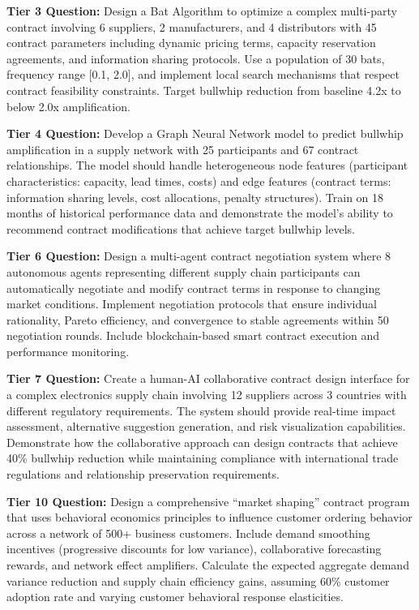 \documentclass{article}
\begin{document}
\textbf{Tier 3 Question:} Design a Bat Algorithm to optimize a complex multi-party contract involving 6 suppliers, 2 manufacturers, and 4 distributors with 45 contract parameters including dynamic pricing terms, capacity reservation agreements, and information sharing protocols. Use a population of 30 bats, frequency range [0.1, 2.0], and implement local search mechanisms that respect contract feasibility constraints. Target bullwhip reduction from baseline 4.2x to below 2.0x amplification.

\textbf{Tier 4 Question:} Develop a Graph Neural Network model to predict bullwhip amplification in a supply network with 25 participants and 67 contract relationships. The model should handle heterogeneous node features (participant characteristics: capacity, lead times, costs) and edge features (contract terms: information sharing levels, cost allocations, penalty structures). Train on 18 months of historical performance data and demonstrate the model's ability to recommend contract modifications that achieve target bullwhip levels.

\textbf{Tier 6 Question:} Design a multi-agent contract negotiation system where 8 autonomous agents representing different supply chain participants can automatically negotiate and modify contract terms in response to changing market conditions. Implement negotiation protocols that ensure individual rationality, Pareto efficiency, and convergence to stable agreements within 50 negotiation rounds. Include blockchain-based smart contract execution and performance monitoring.

\textbf{Tier 7 Question:} Create a human-AI collaborative contract design interface for a complex electronics supply chain involving 12 suppliers across 3 countries with different regulatory requirements. The system should provide real-time impact assessment, alternative suggestion generation, and risk visualization capabilities. Demonstrate how the collaborative approach can design contracts that achieve 40\% bullwhip reduction while maintaining compliance with international trade regulations and relationship preservation requirements.

\textbf{Tier 10 Question:} Design a comprehensive ``market shaping'' contract program that uses behavioral economics principles to influence customer ordering behavior across a network of 500+ business customers. Include demand smoothing incentives (progressive discounts for low variance), collaborative forecasting rewards, and network effect amplifiers. Calculate the expected aggregate demand variance reduction and supply chain efficiency gains, assuming 60\% customer adoption rate and varying customer behavioral response elasticities.
\end{document}

